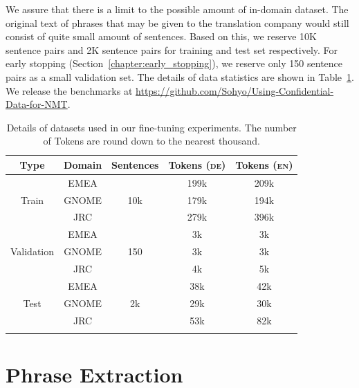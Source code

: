 We assure that there is a limit to the possible amount of in-domain dataset. The original text of phrases that may be given to the translation company would still consist of quite small amount of sentences. Based on this, we reserve 10K sentence pairs and 2K sentence pairs for training and test set respectively. For early stopping (Section~\ref{chapter:early_stopping}), we reserve only 150 sentence pairs as a small validation set. The details of data statistics are shown in Table~\ref{tab:data_description}.
We release the benchmarks at \url{https://github.com/Sohyo/Using-Confidential-Data-for-NMT}.

\begin{table}[ht]
\centering
\begin{tabular}{@{\ } ccccc @{\ }}
\Xhline{3\arrayrulewidth}
{Type}                   & {Domain} & Sentences               & Tokens (\textsc{de}) & Tokens (\textsc{en})     \\ \hline
\multirow{3}{*}{Train} & EMEA   & \multirow{3}{*}{10k} & 199k      & 209k          \\
                       & GNOME  &                      & 179k       & 194k \\
                       & JRC    &                      & 279k       & 396k          \\ \hline
\multirow{3}{*}{Validation}& EMEA   & \multirow{3}{*}{150} & 3k         & 3k            \\
                       & GNOME  &                      & 3k         & 3k             \\
                       & JRC    &                      & 4k         & 5k             \\ \hline
\multirow{3}{*}{Test}  & EMEA   & \multirow{3}{*}{2k}  & 38k        & 42k            \\
                       & GNOME  &                      & 29k        & 30k        \\
                       & JRC    &                      & 53k        & 82k          \\ \Xhline{3\arrayrulewidth}
\end{tabular}
\caption{Details of datasets used in our fine-tuning experiments. The number of Tokens are round down to the nearest thousand.}
\label{tab:data_description}
\end{table}

\section{Phrase Extraction}\label{section:phrase_extraction}

